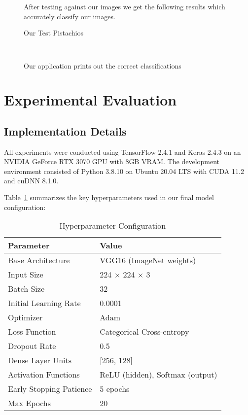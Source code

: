 \documentclass[conference]{IEEEtran}
\begin{document}
\begin{figure}[htbp]
After testing against our images we get the following results which accurately classify our images.
\hfill \break

  {\centering
  \hfill
  \hfill
  \caption{Our Test Pistachios}}
 
\hfill \break
 
 \\
 \hfill \break
    {\centering
    \caption{Our application prints out the correct classifications}
    \label{fig:1.4}}
\end{figure}

\section{Experimental Evaluation}

\subsection{Implementation Details}
All experiments were conducted using TensorFlow 2.4.1 and Keras 2.4.3 on an NVIDIA GeForce RTX 3070 GPU with 8GB VRAM. The development environment consisted of Python 3.8.10 on Ubuntu 20.04 LTS with CUDA 11.2 and cuDNN 8.1.0.

Table~\ref{tab:hyperparameters} summarizes the key hyperparameters used in our final model configuration:

\begin{table}[htbp]
\centering
\caption{Hyperparameter Configuration}
\label{tab:hyperparameters}
\begin{tabular}{ll}
\hline
\textbf{Parameter} & \textbf{Value} \\
\hline
Base Architecture & VGG16 (ImageNet weights) \\
Input Size & 224 × 224 × 3 \\
Batch Size & 32 \\
Initial Learning Rate & 0.0001 \\
Optimizer & Adam \\
Loss Function & Categorical Cross-entropy \\
Dropout Rate & 0.5 \\
Dense Layer Units & [256, 128] \\
Activation Functions & ReLU (hidden), Softmax (output) \\
Early Stopping Patience & 5 epochs \\
Max Epochs & 20 \\
\hline
\end{tabular}
\end{table}
\end{document}
